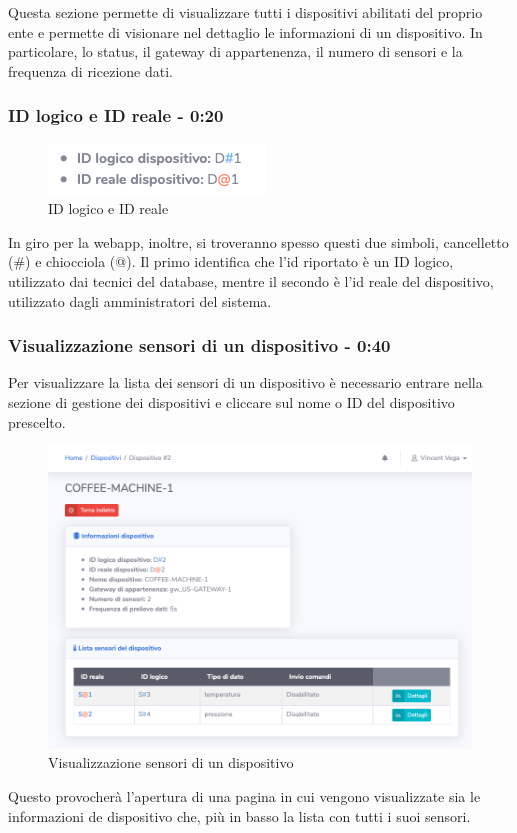 		Questa sezione permette di visualizzare tutti i dispositivi abilitati del proprio ente e permette di visionare nel dettaglio le informazioni di un dispositivo.
		In particolare, lo status, il gateway di appartenenza, il numero di sensori e la frequenza di ricezione dati. 


	\subsubsection{ID logico e ID reale - 0:20}
		\begin{figure}[H]
		\centering
		\includegraphics[scale=0.600]{res/images/membro/IDLogicoIDReale.png}
		\caption{ID logico e ID reale}
		\end{figure}
		In giro per la webapp, inoltre, si troveranno spesso questi due simboli, cancelletto (\#) e chiocciola (@). Il primo identifica che l'id riportato è un ID logico, utilizzato dai tecnici del database, mentre il secondo è l'id reale del dispositivo, utilizzato dagli amministratori del sistema.

	\subsubsection{Visualizzazione sensori di un dispositivo - 0:40}
		Per visualizzare la lista dei sensori di un dispositivo è necessario entrare nella sezione di gestione dei dispositivi e cliccare sul nome o ID del dispositivo prescelto.
		\begin{figure}[H]
		\centering
		\includegraphics[scale=0.600]{res/images/membro/visSensori.png}
		\caption{Visualizzazione sensori di un dispositivo}
		\end{figure}
		Questo provocherà l'apertura di una pagina in cui vengono visualizzate sia le informazioni de dispositivo che, più in basso la lista con tutti i suoi sensori.

